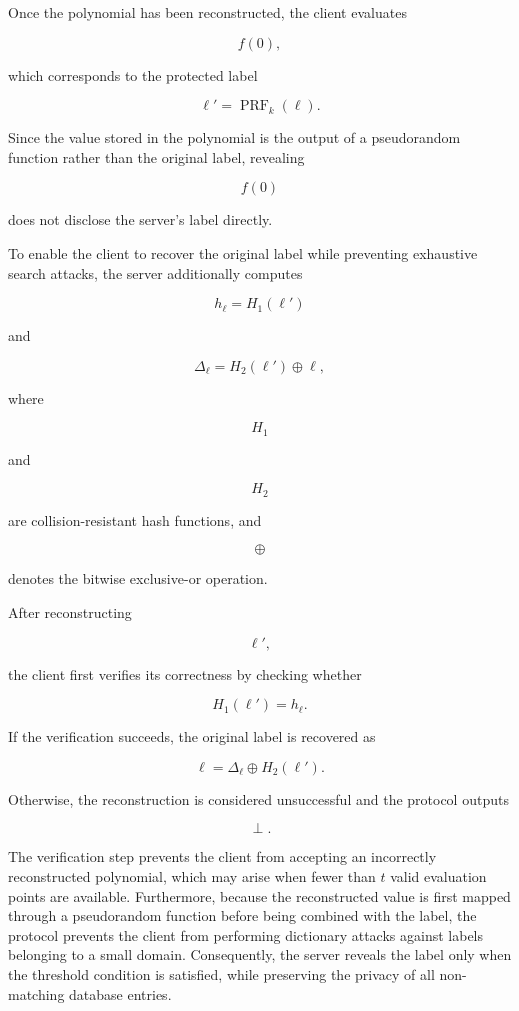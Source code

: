 \documentclass[11pt,a4paper]{article}
\begin{document}
Once the polynomial has been reconstructed, the client evaluates

\[
f(0),
\]

which corresponds to the protected label

\[
\ell'
=
\operatorname{PRF}_{k}(\ell).
\]

Since the value stored in the polynomial is the output of a pseudorandom function rather than the original label, revealing

\[
f(0)
\]

does not disclose the server's label directly.

To enable the client to recover the original label while preventing exhaustive search attacks, the server additionally computes

\[
h_{\ell}
=
H_{1}(\ell')
\]

and

\[
\Delta_{\ell}
=
H_{2}(\ell')
\oplus
\ell,
\]

where

\[
H_1
\]

and

\[
H_2
\]

are collision-resistant hash functions, and

\[
\oplus
\]

denotes the bitwise exclusive-or operation.

After reconstructing

\[
\ell',
\]

the client first verifies its correctness by checking whether

\[
H_1(\ell')
=
h_{\ell}.
\]

If the verification succeeds, the original label is recovered as

\[
\ell
=
\Delta_{\ell}
\oplus
H_2(\ell').
\]

Otherwise, the reconstruction is considered unsuccessful and the protocol outputs

\[
\perp.
\]

The verification step prevents the client from accepting an incorrectly reconstructed polynomial, which may arise when fewer than \(t\) valid evaluation points are available. Furthermore, because the reconstructed value is first mapped through a pseudorandom function before being combined with the label, the protocol prevents the client from performing dictionary attacks against labels belonging to a small domain. Consequently, the server reveals the label only when the threshold condition is satisfied, while preserving the privacy of all non-matching database entries.
\end{document}

